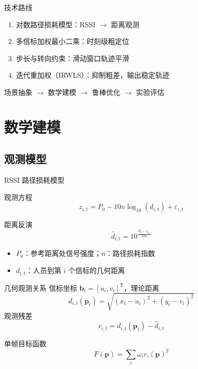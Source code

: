 \documentclass[aspectratio=169]{beamer}
\newcommand{\T}{\mathrm{T}}
\begin{document}
\begin{frame}{技术路线}
  \begin{enumerate}
    \setlength{\itemsep}{8pt}
    \item 对数路径损耗模型：RSSI $\rightarrow$ 距离观测
    \item 多信标加权最小二乘：时刻级粗定位
    \item 步长与转向约束：滑动窗口轨迹平滑
    \item 迭代重加权（IRWLS）：抑制粗差，输出稳定轨迹
  \end{enumerate}
  \vspace{6mm}
  \centering
  场景抽象 $\rightarrow$ 数学建模 $\rightarrow$ 鲁棒优化 $\rightarrow$ 实验评估
\end{frame}

\section{数学建模}

\subsection{观测模型}

\begin{frame}{RSSI 路径损耗模型}
  \begin{block}{观测方程}
    \[
      z_{i,t}=P_0-10n\log_{10}(d_{i,t})+\varepsilon_{i,t}
    \]
  \end{block}
  \begin{block}{距离反演}
    \[
      \hat d_{i,t}=10^{\frac{P_0-z_{i,t}}{10n}}
    \]
  \end{block}
  \begin{itemize}
    \item $P_0$：参考距离处信号强度；$n$：路径损耗指数
    \item $d_{i,t}$：人员到第 $i$ 个信标的几何距离
  \end{itemize}
\end{frame}

\begin{frame}{几何观测关系}
  信标坐标 $\bm b_i=[u_i,v_i]^{\T}$，理论距离
  \[
    d_{i,t}(\bm p_t)=\sqrt{(x_t-u_i)^2+(y_t-v_i)^2}
  \]
  观测残差
  \[
    r_{i,t}=d_{i,t}(\bm p_t)-\hat d_{i,t}
  \]
  \begin{block}{单帧目标函数}
    \[
      F(\bm p)=\sum_i \omega_i r_i(\bm p)^2
    \]
  \end{block}
\end{frame}
\end{document}
